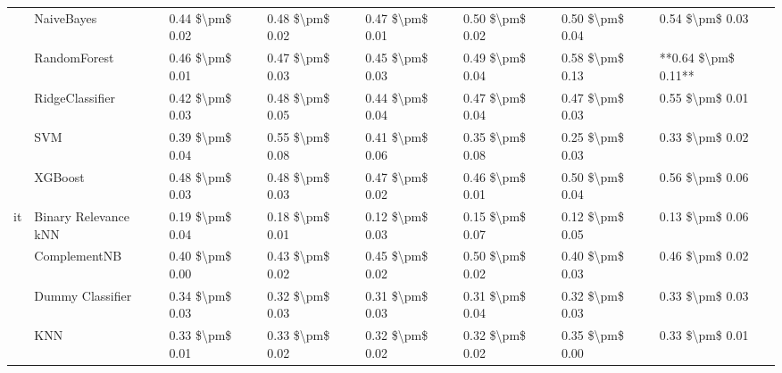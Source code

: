 \begin{tabular}{llllllll}
   & NaiveBayes &  0.44 \$\textbackslash pm\$ 0.02 &           0.48 \$\textbackslash pm\$ 0.02 &       0.47 \$\textbackslash pm\$ 0.01 &        0.50 \$\textbackslash pm\$ 0.02 &                         0.50 \$\textbackslash pm\$ 0.04 &      0.54 \$\textbackslash pm\$ 0.03 \\
   & RandomForest &  0.46 \$\textbackslash pm\$ 0.01 &           0.47 \$\textbackslash pm\$ 0.03 &       0.45 \$\textbackslash pm\$ 0.03 &        0.49 \$\textbackslash pm\$ 0.04 &                         0.58 \$\textbackslash pm\$ 0.13 &  **0.64 \$\textbackslash pm\$ 0.11** \\
   & RidgeClassifier &  0.42 \$\textbackslash pm\$ 0.03 &           0.48 \$\textbackslash pm\$ 0.05 &       0.44 \$\textbackslash pm\$ 0.04 &        0.47 \$\textbackslash pm\$ 0.04 &                         0.47 \$\textbackslash pm\$ 0.03 &      0.55 \$\textbackslash pm\$ 0.01 \\
   & SVM &  0.39 \$\textbackslash pm\$ 0.04 &           0.55 \$\textbackslash pm\$ 0.08 &       0.41 \$\textbackslash pm\$ 0.06 &        0.35 \$\textbackslash pm\$ 0.08 &                         0.25 \$\textbackslash pm\$ 0.03 &      0.33 \$\textbackslash pm\$ 0.02 \\
   & XGBoost &  0.48 \$\textbackslash pm\$ 0.03 &           0.48 \$\textbackslash pm\$ 0.03 &       0.47 \$\textbackslash pm\$ 0.02 &        0.46 \$\textbackslash pm\$ 0.01 &                         0.50 \$\textbackslash pm\$ 0.04 &      0.56 \$\textbackslash pm\$ 0.06 \\
it & Binary Relevance kNN &  0.19 \$\textbackslash pm\$ 0.04 &           0.18 \$\textbackslash pm\$ 0.01 &       0.12 \$\textbackslash pm\$ 0.03 &        0.15 \$\textbackslash pm\$ 0.07 &                         0.12 \$\textbackslash pm\$ 0.05 &      0.13 \$\textbackslash pm\$ 0.06 \\
   & ComplementNB &  0.40 \$\textbackslash pm\$ 0.00 &           0.43 \$\textbackslash pm\$ 0.02 &       0.45 \$\textbackslash pm\$ 0.02 &        0.50 \$\textbackslash pm\$ 0.02 &                         0.40 \$\textbackslash pm\$ 0.03 &      0.46 \$\textbackslash pm\$ 0.02 \\
   & Dummy Classifier &  0.34 \$\textbackslash pm\$ 0.03 &           0.32 \$\textbackslash pm\$ 0.03 &       0.31 \$\textbackslash pm\$ 0.03 &        0.31 \$\textbackslash pm\$ 0.04 &                         0.32 \$\textbackslash pm\$ 0.03 &      0.33 \$\textbackslash pm\$ 0.03 \\
   & KNN &  0.33 \$\textbackslash pm\$ 0.01 &           0.33 \$\textbackslash pm\$ 0.02 &       0.32 \$\textbackslash pm\$ 0.02 &        0.32 \$\textbackslash pm\$ 0.02 &                         0.35 \$\textbackslash pm\$ 0.00 &      0.33 \$\textbackslash pm\$ 0.01 \\

\end{tabular}

